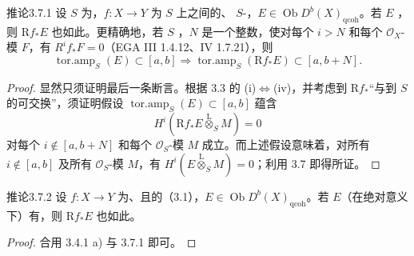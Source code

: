 \begin{SGAresult}{推论}{3.7.1}
设 $S$ 为，$f:X\to Y$ 为 $S$ 上之间的、 $S$-，$E\in\operatorname{Ob}D^b(X)_{\mathrm{qcoh}}$。若 $E$ ，则 $\mathrm Rf_*E$ 也如此。更精确地，若 $S$ ，$N$ 是一个整数，使对每个 $i>N$ 和每个 $\mathcal O_X$-模 $F$，有 $R^if_*F=0$（EGA III 1.4.12、IV 1.7.21），则
\[\operatorname{tor.amp}_S(E)\subset[a,b]\Longrightarrow\operatorname{tor.amp}_S(\mathrm Rf_*E)\subset[a,b+N].\]
\end{SGAresult}
\begin{proof}
显然只须证明最后一条断言。根据 3.3 的 (i)$\Longleftrightarrow$(iv)，并考虑到 $\mathrm Rf_*$“与到 $S$ 的可交换”，须证明假设 $\operatorname{tor.amp}_S(E)\subset[a,b]$ 蕴含
\[H^i(\mathrm Rf_*E\mathbin{\overset{\mathrm L}{\otimes}}_SM)=0\]
对每个 $i\notin[a,b+N]$ 和每个 $\mathcal O_S$-模 $M$ 成立。而上述假设意味着，对所有 $i\notin[a,b]$ 及所有 $\mathcal O_S$-模 $M$，有 $H^i(E\mathbin{\overset{\mathrm L}{\otimes}}_SM)=0$；利用 3.7 即得所证。
\end{proof}
\begin{SGAresult}{推论}{3.7.2}
设 $f:X\to Y$ 为、且的（3.1），$E\in\operatorname{Ob}D^b(X)_{\mathrm{qcoh}}$。若 $E$（在绝对意义下）有，则 $\mathrm Rf_*E$ 也如此。
\end{SGAresult}
\begin{proof}合用 3.4.1 a) 与 3.7.1 即可。\end{proof}
